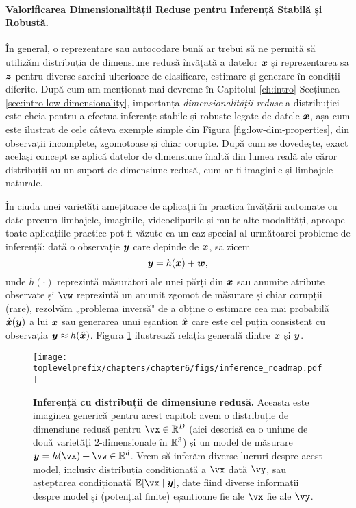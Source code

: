 \documentclass[../../book-main_ro.tex]{subfiles}
\begin{document}
\paragraph{Valorificarea Dimensionalității Reduse pentru Inferență Stabilă și Robustă.}
În general, o reprezentare sau autocodare bună ar trebui să ne permită să utilizăm distribuția de dimensiune redusă învățată a datelor $\bm{x}$ și reprezentarea sa $\bm{z}$ pentru diverse sarcini ulterioare de clasificare, estimare și generare în condiții diferite. După cum am menționat mai devreme în Capitolul \ref{ch:intro} Secțiunea \ref{sec:intro-low-dimensionality}, importanța {\em dimensionalității reduse} a distribuției este cheia pentru a efectua inferențe stabile și robuste legate de datele $\bm{x}$, așa cum este ilustrat de cele câteva exemple simple din Figura \ref{fig:low-dim-properties}, din observații incomplete, zgomotoase și chiar corupte. După cum se dovedește, exact același concept se aplică datelor de dimensiune înaltă din lumea reală ale căror distribuții au un suport de dimensiune redusă, cum ar fi imaginile și limbajele naturale.

În ciuda unei varietăți amețitoare de aplicații în practica învățării automate cu date precum limbajele, imaginile, videoclipurile și multe alte modalități, aproape toate aplicațiile practice pot fi văzute ca un caz special al următoarei probleme de inferență: dată o observație $\bm{y}$ care depinde de $\bm{x}$, să zicem
\begin{equation}
    \bm{y} = h(\bm{x}) + \boldsymbol{w},
\end{equation}
unde $h(\cdot)$ reprezintă măsurători ale unei părți din $\bm{x}$ sau anumite atribute observate și $\vw$ reprezintă un anumit zgomot de măsurare și chiar corupții (rare), rezolvăm „problema inversă" de a obține o estimare cea mai probabilă $\hat {\bm{x}}(\bm{y})$ a lui $\bm{x}$ sau generarea unui eșantion $\hat{\bm{x}}$ care este cel puțin consistent cu observația $\bm{y} \approx h(\hat{\bm{x}})$. Figura \ref{fig:inference_roadmap} ilustrează relația generală dintre $\bm{x}$ și $\bm{y}$.

\begin{figure}
  \centering 
  \texttt{[image: \\toplevelprefix/chapters/chapter6/figs/inference\_roadmap.pdf]}
  \caption{\small \textbf{Inferență cu distribuții de dimensiune redusă.} Aceasta este imaginea generică pentru acest capitol: avem o distribuție de dimensiune redusă pentru \(\vx \in \R^{D}\) (aici descrisă ca o uniune de două varietăți \(2\)-dimensionale în \(\mathbb{R}^{3}\)) și un model de măsurare \(\y = h(\vx) + \vw \in \R^{d}\). Vrem să inferăm diverse lucruri despre acest model, inclusiv distribuția condiționată a \(\vx\) dată \(\vy\), sau așteptarea condiționată \(\mathbb{E}[\vx \mid \y]\), date fiind diverse informații despre model și (potențial finite) eșantioane fie ale \(\vx\) fie ale \(\vy\).}
  \label{fig:inference_roadmap}
\end{figure}
\end{document}
